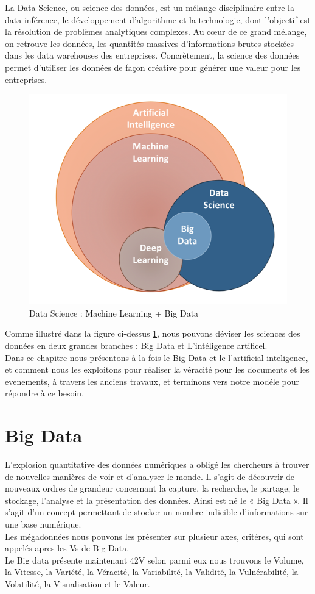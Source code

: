 \documentclass[12pt]{report}
\begin{document}
La Data Science, ou science des données, est un mélange disciplinaire entre la data inférence, le développement d’algorithme et la technologie, dont l’objectif est la résolution de problèmes analytiques complexes. Au cœur de ce grand mélange, on retrouve les données, les quantités massives d’informations brutes stockées dans les data warehouses des entreprises. Concrètement, la science des données permet d’utiliser les données de façon créative pour générer une valeur pour les entreprises.

\begin{figure}[hbtp]
    \centering
    \includegraphics[width=.5\textwidth]{dcbdml}
    \caption{Data Science : Machine Learning + Big Data}
    \label{aaa : a1}
\end{figure}

Comme illustré dans la figure ci-dessus \ref{aaa : a1}, nous pouvons déviser les sciences des données en deux grandes branches : Big Data et L'intéligence artificel. \\
Dans ce chapitre nous présentons à la fois le Big Data et le l'artificial inteligence, et comment nous les exploitons pour réaliser la véracité pour les documents et les evenements, à travers les anciens travaux, et terminons vers notre modéle pour répondre à ce besoin.

\newpage
\section{Big Data}
L’explosion quantitative des données numériques a obligé les chercheurs à trouver de nouvelles manières de voir et d’analyser le monde. Il s’agit de découvrir de nouveaux ordres de grandeur concernant la capture, la recherche, le partage, le stockage, l’analyse et la présentation des données. Ainsi est né le « Big Data ». Il s’agit d’un concept permettant de stocker un nombre indicible d’informations sur une base numérique\cite{33}. \\
Les mégadonnées nous pouvons les présenter sur plusieur axes, critéres, qui sont appelés apres les Vs de Big Data. \\
Le Big data présente maintenant 42V  selon\cite{34} parmi eux nous trouvons le Volume, la Vitesse, la Variété, la Véracité, la Variabilité, la Validité, la Vulnérabilité, la Volatilité, la Visualisation et le Valeur.
\end{document}

